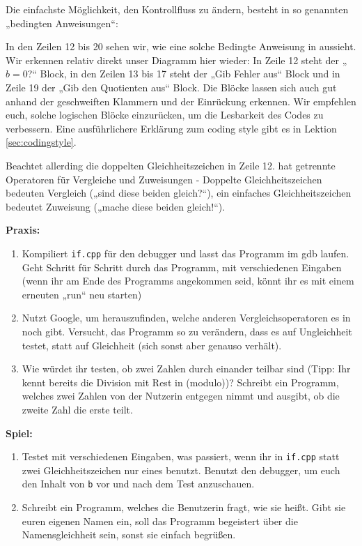 Die einfachste Möglichkeit, den Kontrollfluss zu ändern, besteht in so
genannten „bedingten Anweisungen“:

In den Zeilen 12 bis 20 sehen wir, wie eine solche Bedingte Anweisung in \Cpp
aussieht. Wir erkennen relativ direkt unser Diagramm hier wieder: In Zeile 12
steht der „$b=0$?“ Block, in den Zeilen 13 bis 17 steht der „Gib Fehler aus“
Block und in Zeile 19 der „Gib den Quotienten aus“ Block. Die Blöcke lassen sich auch gut anhand der geschweiften Klammern und der Einrückung erkennen. Wir empfehlen euch, solche logischen Blöcke einzurücken, um die Lesbarkeit des Codes zu verbessern. Eine ausführlichere Erklärung zum coding style gibt es in Lektion \ref{sec:codingstyle}.

Beachtet allerding die doppelten Gleichheitszeichen in Zeile 12. \Cpp hat
getrennte Operatoren für Vergleiche und Zuweisungen - Doppelte
Gleichheitszeichen bedeuten Vergleich („sind diese beiden gleich?“), ein
einfaches Gleichheitszeichen bedeutet Zuweisung („mache diese beiden gleich!“).

\textbf{Praxis:}
\begin{enumerate}
    \item Kompiliert \texttt{if.cpp} für den debugger und lasst das Programm im
          gdb laufen. Geht Schritt für Schritt durch das Programm, mit
          verschiedenen Eingaben (wenn ihr am Ende des Programms angekommen seid,
          könnt ihr es mit einem erneuten „run“ neu starten)
    \item Nutzt Google, um herauszufinden, welche anderen Vergleichsoperatoren
          es in \Cpp noch gibt. Versucht, das Programm so zu verändern, dass es
          auf Ungleichheit testet, statt auf Gleichheit (sich sonst aber genauso
          verhält).
    \item Wie würdet ihr testen, ob zwei Zahlen durch einander teilbar sind
          (Tipp: Ihr kennt bereits die Division mit Rest in \Cpp (modulo))?
          Schreibt ein Programm, welches zwei Zahlen von der Nutzerin entgegen
          nimmt und ausgibt, ob die zweite Zahl die erste teilt.
\end{enumerate}

\textbf{Spiel:}
\begin{enumerate}
    \item Testet mit verschiedenen Eingaben, was passiert, wenn ihr in
          \texttt{if.cpp} statt zwei Gleichheitszeichen nur eines benutzt.
          Benutzt den debugger, um euch den Inhalt von \texttt{b} vor und nach
          dem Test anzuschauen.
    \item Schreibt ein Programm, welches die Benutzerin fragt, wie sie heißt.
          Gibt sie euren eigenen Namen ein, soll das Programm begeistert über die
          Namensgleichheit sein, sonst sie einfach begrüßen.
\end{enumerate}
